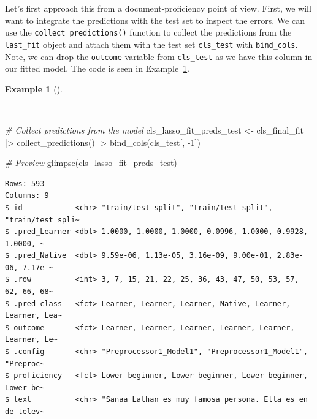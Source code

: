 \documentclass[
  letterpaper,
]{latex/krantz}
\newenvironment{Shaded}{\begin{snugshade}}{\end{snugshade}}
\newcommand{\CommentTok}[1]{\textcolor[rgb]{0.00,0.00,0.00}{\textit{#1}}}
\newcommand{\DecValTok}[1]{\textcolor[rgb]{0.00,0.00,0.00}{#1}}
\newcommand{\FunctionTok}[1]{\textcolor[rgb]{0.00,0.00,0.00}{#1}}
\newcommand{\NormalTok}[1]{\textcolor[rgb]{0.00,0.00,0.00}{#1}}
\newcommand{\OtherTok}[1]{\textcolor[rgb]{0.00,0.00,0.00}{#1}}
\newcommand{\SpecialCharTok}[1]{\textcolor[rgb]{0.00,0.00,0.00}{#1}}
\theoremstyle{definition}
\newtheorem{example}{Example}[chapter]
\theoremstyle{remark}
\begin{document}
Let's first approach this from a document-proficiency point of view.
First, we will want to integrate the predictions with the test set to
inspect the errors. We can use the \texttt{collect\_predictions()}
function to collect the predictions from the \texttt{last\_fit} object
and attach them with the test set \texttt{cls\_test} with
\texttt{bind\_cols}. Note, we can drop the \texttt{outcome} variable
from \texttt{cls\_test} as we have this column in our fitted model. The
code is seen in
Example~\ref{exm-predict-class-tune-hyperparameters-integrate-test}.

\begin{example}[]\protect\hypertarget{exm-predict-class-tune-hyperparameters-integrate-test}{}\label{exm-predict-class-tune-hyperparameters-integrate-test}

~

\begin{Shaded}
\begin{Highlighting}[]
\CommentTok{\# Collect predictions from the model}
\NormalTok{cls\_lasso\_fit\_preds\_test }\OtherTok{\textless{}{-}}
\NormalTok{  cls\_final\_fit }\SpecialCharTok{|\textgreater{}}
  \FunctionTok{collect\_predictions}\NormalTok{() }\SpecialCharTok{|\textgreater{}}
  \FunctionTok{bind\_cols}\NormalTok{(cls\_test[, }\SpecialCharTok{{-}}\DecValTok{1}\NormalTok{])}

\CommentTok{\# Preview}
\FunctionTok{glimpse}\NormalTok{(cls\_lasso\_fit\_preds\_test)}
\end{Highlighting}
\end{Shaded}

\begin{verbatim}
Rows: 593
Columns: 9
$ id            <chr> "train/test split", "train/test split", "train/test spli~
$ .pred_Learner <dbl> 1.0000, 1.0000, 1.0000, 0.0996, 1.0000, 0.9928, 1.0000, ~
$ .pred_Native  <dbl> 9.59e-06, 1.13e-05, 3.16e-09, 9.00e-01, 2.83e-06, 7.17e-~
$ .row          <int> 3, 7, 15, 21, 22, 25, 36, 43, 47, 50, 53, 57, 62, 66, 68~
$ .pred_class   <fct> Learner, Learner, Learner, Native, Learner, Learner, Lea~
$ outcome       <fct> Learner, Learner, Learner, Learner, Learner, Learner, Le~
$ .config       <chr> "Preprocessor1_Model1", "Preprocessor1_Model1", "Preproc~
$ proficiency   <fct> Lower beginner, Lower beginner, Lower beginner, Lower be~
$ text          <chr> "Sanaa Lathan es muy famosa persona. Ella es en de telev~
\end{verbatim}

\end{example}
\end{document}
